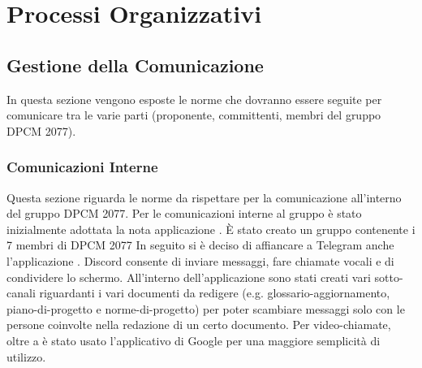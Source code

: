 \section{Processi Organizzativi}

\subsection{Gestione della Comunicazione}
In questa sezione vengono esposte le norme che dovranno essere seguite per comunicare tra le varie parti (proponente,  committenti,  membri  del  gruppo DPCM 2077).
\subsubsection{Comunicazioni Interne}

Questa sezione riguarda le norme da rispettare per la comunicazione all'interno del gruppo DPCM 2077. Per le comunicazioni interne al gruppo è stato inizialmente adottata la nota applicazione .
È stato creato un gruppo contenente i 7 membri di DPCM 2077
In seguito si è deciso di affiancare a Telegram anche l'applicazione .
Discord consente di inviare messaggi, fare chiamate vocali e di condividere lo schermo.
All'interno dell'applicazione sono stati creati vari sotto-canali riguardanti i vari documenti da redigere (e.g. glossario-aggiornamento, piano-di-progetto e norme-di-progetto)
per poter scambiare messaggi solo con le persone coinvolte nella redazione di un certo documento.
Per video-chiamate, oltre a  è stato usato l'applicativo  di Google per una maggiore semplicità di utilizzo.

